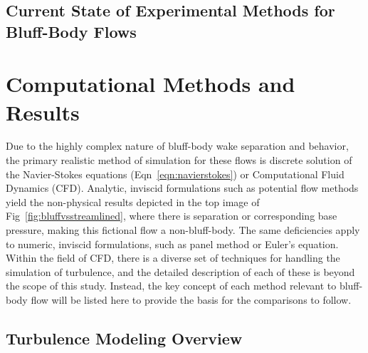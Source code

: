 \documentclass[journal]{new-aiaa}
\begin{document}
\subsection{Current State of Experimental Methods for Bluff-Body Flows} \label{subsec:currentstateexperimental}
































\clearpage

\section{Computational Methods and Results} \label{sec:computationalmethods}

Due to the highly complex nature of bluff-body wake separation and behavior, the primary realistic method of simulation for these flows is discrete solution of the Navier-Stokes equations (Eqn~\ref{eqn:navierstokes}) or Computational Fluid Dynamics (CFD). Analytic, inviscid formulations such as potential flow methods yield the non-physical results depicted in the top image of Fig~\ref{fig:bluffvsstreamlined}, where there is separation or corresponding base pressure, making this fictional flow a non-bluff-body. The same deficiencies apply to numeric, inviscid formulations, such as panel method or Euler's equation. Within the field of CFD, there is a diverse set of techniques for handling the simulation of turbulence, and the detailed description of each of these is beyond the scope of this study. Instead, the key concept of each method relevant to bluff-body flow will be listed here to provide the basis for the comparisons to follow.


\subsection{Turbulence Modeling Overview} \label{subsec:turbulencemodeling}
\end{document}
